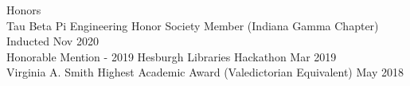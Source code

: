 \documentclass[10pt]{resume} %
\begin{document}
\begin{rSection}{Honors}
\\ { Tau Beta Pi Engineering Honor Society Member (Indiana Gamma Chapter) } \hfill { Inducted Nov 2020 }
\\ { Honorable Mention - 2019 Hesburgh Libraries Hackathon } \hfill { Mar 2019 }
\\ { Virginia A. Smith Highest Academic Award (Valedictorian Equivalent) } \hfill { May 2018 }
\end{rSection}









\newpage
\end{document}
